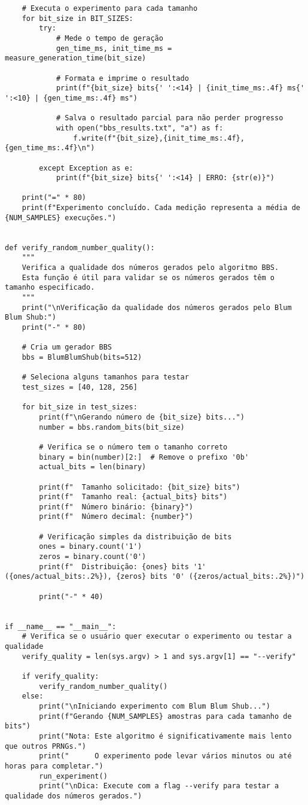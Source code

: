 \begin{verbatim}
    # Executa o experimento para cada tamanho
    for bit_size in BIT_SIZES:
        try:
            # Mede o tempo de geração
            gen_time_ms, init_time_ms = measure_generation_time(bit_size)
            
            # Formata e imprime o resultado
            print(f"{bit_size} bits{' ':<14} | {init_time_ms:.4f} ms{' ':<10} | {gen_time_ms:.4f} ms")
            
            # Salva o resultado parcial para não perder progresso
            with open("bbs_results.txt", "a") as f:
                f.write(f"{bit_size},{init_time_ms:.4f},{gen_time_ms:.4f}\n")
                
        except Exception as e:
            print(f"{bit_size} bits{' ':<14} | ERRO: {str(e)}")
    
    print("=" * 80)
    print(f"Experimento concluído. Cada medição representa a média de {NUM_SAMPLES} execuções.")


def verify_random_number_quality():
    """
    Verifica a qualidade dos números gerados pelo algoritmo BBS.
    Esta função é útil para validar se os números gerados têm o tamanho especificado.
    """
    print("\nVerificação da qualidade dos números gerados pelo Blum Blum Shub:")
    print("-" * 80)
    
    # Cria um gerador BBS
    bbs = BlumBlumShub(bits=512)
    
    # Seleciona alguns tamanhos para testar
    test_sizes = [40, 128, 256]
    
    for bit_size in test_sizes:
        print(f"\nGerando número de {bit_size} bits...")
        number = bbs.random_bits(bit_size)
        
        # Verifica se o número tem o tamanho correto
        binary = bin(number)[2:]  # Remove o prefixo '0b'
        actual_bits = len(binary)
        
        print(f"  Tamanho solicitado: {bit_size} bits")
        print(f"  Tamanho real: {actual_bits} bits")
        print(f"  Número binário: {binary}")
        print(f"  Número decimal: {number}")
        
        # Verificação simples da distribuição de bits
        ones = binary.count('1')
        zeros = binary.count('0')
        print(f"  Distribuição: {ones} bits '1' ({ones/actual_bits:.2%}), {zeros} bits '0' ({zeros/actual_bits:.2%})")
        
        print("-" * 40)


if __name__ == "__main__":
    # Verifica se o usuário quer executar o experimento ou testar a qualidade
    verify_quality = len(sys.argv) > 1 and sys.argv[1] == "--verify"
    
    if verify_quality:
        verify_random_number_quality()
    else:
        print("\nIniciando experimento com Blum Blum Shub...")
        print(f"Gerando {NUM_SAMPLES} amostras para cada tamanho de bits")
        print("Nota: Este algoritmo é significativamente mais lento que outros PRNGs.")
        print("      O experimento pode levar vários minutos ou até horas para completar.")
        run_experiment()
        print("\nDica: Execute com a flag --verify para testar a qualidade dos números gerados.")
\end{verbatim}
